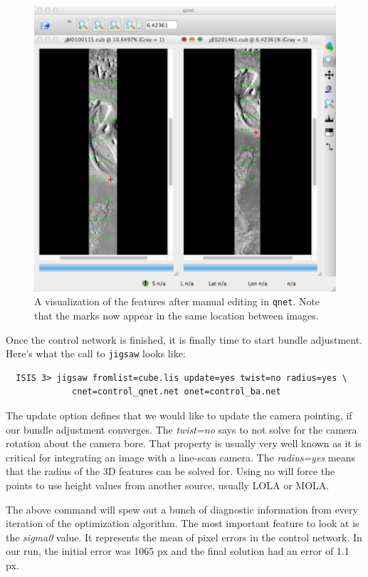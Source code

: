 \begin{figure}[ht]
  \centering
  \includegraphics[width=5in]{images/qnet/Qnet_AfterQnetManual_400px.png}
  \caption{A visualization of the features after manual editing in
    \texttt{qnet}. Note that the marks now appear in the same location
    between images.}
  \label{fig:after_manual}
\end{figure}

Once the control network is finished, it is finally time to start
bundle adjustment. Here's what the call to \texttt{jigsaw} looks like:

\begin{verbatim}
  ISIS 3> jigsaw fromlist=cube.lis update=yes twist=no radius=yes \
             cnet=control_qnet.net onet=control_ba.net
\end{verbatim}

The update option defines that we would like to update the camera
pointing, if our bundle adjustment converges. The \textit{twist=no}
says to not solve for the camera rotation about the camera bore. That
property is usually very well known as it is critical for integrating
an image with a line-scan camera. The \textit{radius=yes} means that
the radius of the 3D features can be solved for. Using no will force
the points to use height values from another source, usually LOLA or
MOLA.

The above command will spew out a bunch of diagnostic information from
every iteration of the optimization algorithm. The most important
feature to look at is the \textit{sigma0} value. It represents the mean of
pixel errors in the control network. In our run, the initial error was
1065 px and the final solution had an error of 1.1 px.

